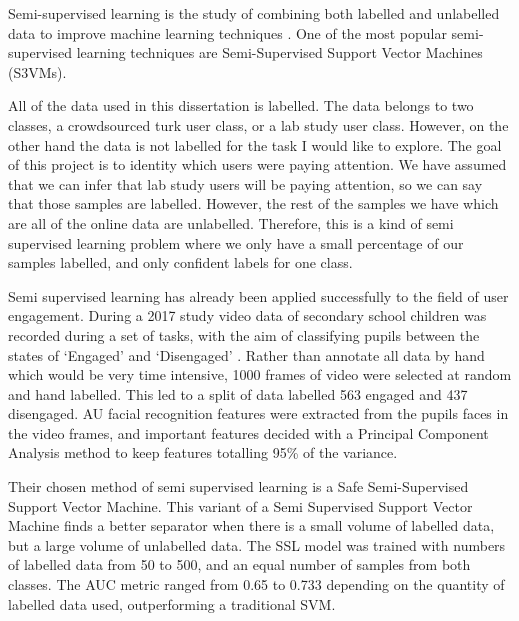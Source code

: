 \documentclass{article}
\begin{document}
Semi-supervised learning is the study of combining both labelled and unlabelled data to improve machine learning techniques \cite{zhu2009introduction}.
One of the most popular semi-supervised learning techniques are Semi-Supervised Support Vector Machines (S3VMs).




All of the data used in this dissertation is labelled.
The data belongs to two classes, a crowdsourced turk user class, or a lab study user class.
However, on the other hand the data is not labelled for the task I would like to explore.
The goal of this project is to identity which users were paying attention.
We have assumed that we can infer that lab study users will be paying attention, so we can say that those samples are labelled.
However, the rest of the samples we have which are all of the online data are unlabelled.
Therefore, this is a kind of semi supervised learning problem where we only have a small percentage of our samples labelled, and only confident labels for one class.

Semi supervised learning has already been applied successfully to the field of user engagement.
During a 2017 study video data of secondary school children was recorded during a set of tasks, with the aim of classifying pupils between the states of `Engaged' and `Disengaged' \cite{nezami2017semi}.
Rather than annotate all data by hand which would be very time intensive, 1000 frames of video were selected at random and hand labelled.
This led to a split of data labelled 563 engaged and 437 disengaged.
AU facial recognition features were extracted from the pupils faces in the video frames, and important features decided with a Principal Component Analysis method to keep features totalling 95\% of the variance.

Their chosen method of semi supervised learning is a Safe Semi-Supervised Support Vector Machine.
This variant of a Semi Supervised Support Vector Machine finds a better separator when there is a small volume of labelled data, but a large volume of unlabelled data.
The SSL model was trained with numbers of labelled data from 50 to 500, and an equal number of samples from both classes.
The AUC metric ranged from 0.65 to 0.733 depending on the quantity of labelled data used, outperforming a traditional SVM.
\end{document}
